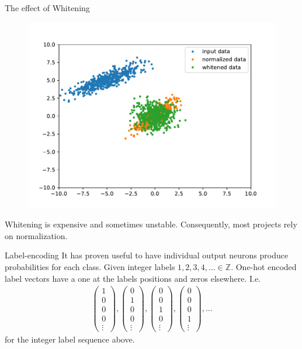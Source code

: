 \documentclass[notes]{beamer}
\begin{document}
    \begin{frame}{The effect of Whitening}
    \begin{figure}
    \includegraphics[width=\linewidth]{./figures/whitened.pdf}
      \end{figure}
      Whitening is expensive and sometimes unstable. Consequently, most projects rely on normalization.
    \end{frame}


    \begin{frame}{Label-encoding}
      It has proven useful to have individual output neurons produce probabilities for each class.
      Given integer labels $1,2,3,4, \dots \in \mathbb{Z}$. One-hot encoded label vectors have a one 
      at the labels positions and zeros elsewhere. I.e.
      \begin{align}
        \begin{pmatrix}
          1 \\ 0 \\ 0 \\ 0 \\ \vdots
        \end{pmatrix},
        \begin{pmatrix}
          0 \\ 1 \\ 0 \\ 0 \\\vdots
        \end{pmatrix},
        \begin{pmatrix}
          0 \\ 0 \\ 1 \\ 0 \\\vdots
        \end{pmatrix},
        \begin{pmatrix}
          0 \\ 0 \\ 0 \\ 1 \\\vdots
        \end{pmatrix},
        \dots
      \end{align}
      for the integer label sequence above.
    \end{frame}
\end{document}
